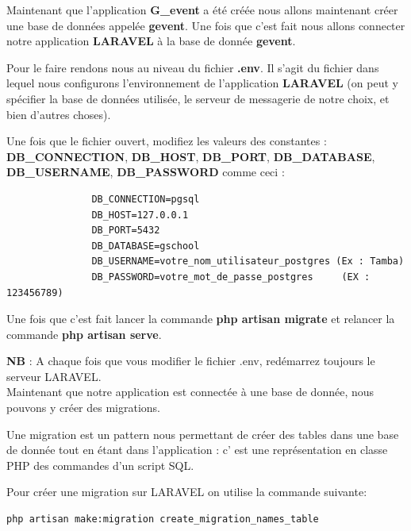 \documentclass[12pt,a4paper]{article}
\begin{document}
Maintenant que l'application \textbf{G\_event} a été créée nous allons maintenant créer une base de données appelée \textbf{gevent}. Une fois que c'est fait nous allons connecter notre application \textbf{LARAVEL} à la base de donnée \textbf{gevent}.\par
Pour le faire rendons nous au niveau du fichier \textbf{.env}. Il s'agit du fichier dans lequel nous configurons l'environnement de l'application \textbf{LARAVEL} (on peut y spécifier la base de données utilisée, le serveur de messagerie de notre choix, et bien d'autres choses).\par 

\newpage


Une fois que le fichier ouvert, modifiez les valeurs des
constantes :  \textbf{DB\_CONNECTION}, \textbf{DB\_HOST}, \textbf{DB\_PORT}, \textbf{DB\_DATABASE}, \textbf{DB\_USERNAME}, \textbf{DB\_PASSWORD} comme ceci :\\


\begin{verbatim}
               DB_CONNECTION=pgsql 
               DB_HOST=127.0.0.1
               DB_PORT=5432
               DB_DATABASE=gschool
               DB_USERNAME=votre_nom_utilisateur_postgres (Ex : Tamba)
               DB_PASSWORD=votre_mot_de_passe_postgres     (EX : 123456789)
\end{verbatim}



Une fois que c'est fait lancer la commande \textbf{php artisan migrate} et relancer la commande \textbf{php artisan serve}.\par
\textbf{NB} : A chaque fois que vous modifier le fichier .env, redémarrez toujours le serveur LARAVEL.\\

Maintenant que notre application est connectée à une base de donnée, nous pouvons y créer des migrations.\par
Une migration est un pattern nous permettant de créer des tables dans une base de donnée tout en étant dans l'application : c' est une représentation en classe PHP des commandes d'un script SQL.\par
Pour créer une migration sur LARAVEL on utilise la commande suivante: \par

\begin{verbatim}
php artisan make:migration create_migration_names_table

\end{verbatim}
\end{document}
